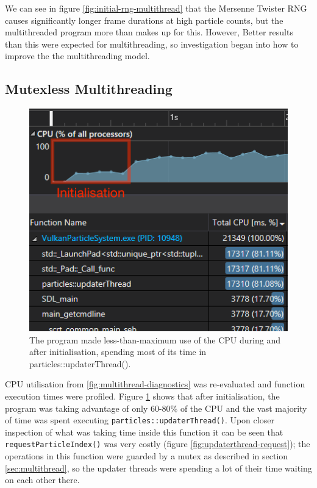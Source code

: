 \documentclass[11pt, a4paper, twocolumn]{article}
\begin{document}
We can see in figure \ref{fig:initial-rng-multithread} that the Mersenne Twister RNG causes significantly longer frame durations at high particle counts, but the multithreaded program more than makes up for this. However, Better results than this were expected for multithreading, so investigation began into how to improve the the multithreading model.

\subsection{Mutexless Multithreading}

\begin{figure}[h]
\includegraphics[width=\linewidth]{rng-mutex-diag}
\caption{The program made less-than-maximum use of the CPU during and after initialisation, spending most of its time in particles::updaterThread().}
\label{fig:rng-mutex-diag}
\end{figure}

CPU utilisation from \ref{fig:multithread-diagnostics} was re-evaluated and function execution times were profiled. Figure \ref{fig:rng-mutex-diag} shows that after initialisation, the program was taking advantage of only 60-80\% of the CPU and the vast majority of time was spent executing \verb|particles::updaterThread()|. Upon closer inspection of what was taking time inside this function it can be seen that \verb|requestParticleIndex()| was very costly (figure \ref{fig:updaterthread-request}); the operations in this function were guarded by a mutex as described in section \ref{sec:multithread}, so the updater threads were spending a lot of their time waiting on each other there.
\end{document}
